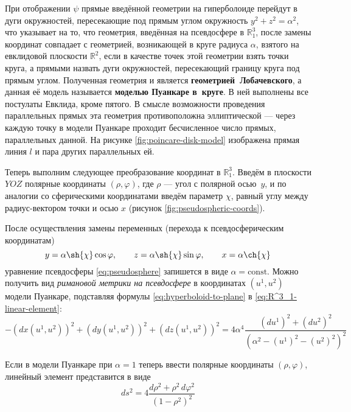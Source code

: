 \documentclass{article}
\numberwithin{equation}{section}
\renewcommand{\phi}{\varphi}
\newcommand{\neword}[1]{\textbf{#1}}
\begin{document}
При отображении $\psi$ прямые введённой геометрии на гиперболоиде
перейдут в дуги окружностей, пересекающие под прямым углом окружность
$y^2 + z^2 = \alpha^2$, что указывает на то, что геометрия, введённая
на псевдосфере в $\mathbb{R}^3_1$, после замены координат совпадает с
геометрией, возникающей в круге радиуса $\alpha$, взятого на
евклидовой плоскости $\mathbb{R}^2$, если в качестве точек этой
геометрии взять точки круга, а прямыми назвать дуги окружностей,
пересекающий границу круга под прямым углом. Полученная геометрия и
является \neword{геометрией Лобачевского}, а данная её модель
называется \neword{моделью Пуанкаре в круге}. В ней выполнены все
постулаты Евклида, кроме пятого. В смысле возможности проведения
параллельных прямых эта геометрия противоположна эллиптической — через
каждую точку в модели Пуанкаре проходит бесчисленное число прямых,
параллельных данной. На рисунке \ref{fig:poincare-disk-model}
изображена прямая линия $l$ и пара других параллельных ей.



Теперь выполним следующее преобразование координат в $\mathbb{R}^3_1$.
Введём в плоскости $YOZ$ полярные координаты $(\rho, \phi)$, где
$\rho$ — угол с полярной осью $y$, и по аналогии со сферическими
координатами введём параметр $\chi$, равный углу между радиус-вектором
точки и осью $x$ (рисунок \ref{fig:pseudospheric-coords}).



После осуществления замены переменных (перехода к псевдосферическим
координатам)
\begin{equation*}\label{eq:pseudospheric-coords}
  y = \alpha \sh{\chi} \cos{\phi}, \qquad
  z = \alpha \sh{\chi} \sin{\phi}, \qquad
  x = \alpha \ch{\chi}
\end{equation*}
уравнение псевдосферы \eqref{eq:pseudosphere} запишется в виде $\alpha
= \text{const}$. Можно получить вид \emph{римановой метрики на
  псевдосфере} в координатах $(u^1, u^2)$ модели Пуанкаре, подставляя
формулы \eqref{eq:hyperboloid-to-plane} в
\eqref{eq:R^3_1-linear-element}:
\begin{equation*}
  -(dx(u^1, u^2))^2 + (dy(u^1, u^2))^2 + (dz(u^1, u^2))^2 =
  4\alpha^4\frac{(du^1)^2 + (du^2)^2}
                {\left (\alpha^2 - (u^1)^2-(u^2)^2 \right )^2}
\end{equation*}

Если в модели Пуанкаре при $\alpha=1$ теперь ввести полярные
координаты $(\rho, \phi)$, линейный элемент представится в виде
\begin{equation}\label{eq:poincare-lin-elt-polar}
  ds^2 = 4\frac{d\rho^2 + \rho^2\,d\phi^2}{\left (1 - \rho^2 \right )^2}
\end{equation}
\end{document}
